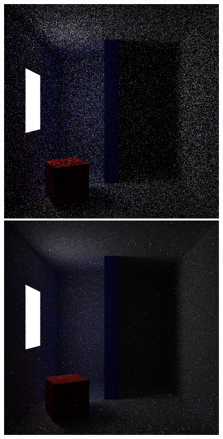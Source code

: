 \documentclass[../dissertation.tex]{subfiles}
\begin{document}
\begin{figure}[h]
\centering
\begin{minipage}{.45\textwidth}
\includegraphics[width=0.99\textwidth]{images/renders/simple_room/default_16.png}    
\end{minipage}\hspace{2em}
\begin{minipage}{.45\textwidth}
\includegraphics[width=0.99\textwidth]{images/renders/simple_room/reinforcement_16.png}    

\end{minipage}
\end{figure}
\end{document}
